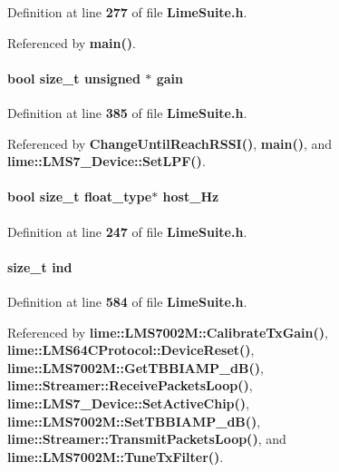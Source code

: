Definition at line {\bf 277} of file {\bf Lime\+Suite.\+h}.



Referenced by {\bf main()}.

\paragraph[{gain}]{\setlength{\rightskip}{0pt plus 5cm}bool size\+\_\+t unsigned $\ast$ gain}\label{group__FN__HIGH__LVL_ga1275acc2013b13f44e8d43fcde951ef1}


Definition at line {\bf 385} of file {\bf Lime\+Suite.\+h}.



Referenced by {\bf Change\+Until\+Reach\+R\+S\+S\+I()}, {\bf main()}, and {\bf lime\+::\+L\+M\+S7\+\_\+\+Device\+::\+Set\+L\+P\+F()}.

\paragraph[{host\+\_\+\+Hz}]{\setlength{\rightskip}{0pt plus 5cm}bool size\+\_\+t {\bf float\+\_\+type}$\ast$ host\+\_\+\+Hz}\label{group__FN__HIGH__LVL_gaaa9184e2d61bf9dd267f76bb5db90d50}


Definition at line {\bf 247} of file {\bf Lime\+Suite.\+h}.

\paragraph[{ind}]{\setlength{\rightskip}{0pt plus 5cm}size\+\_\+t ind}\label{group__FN__HIGH__LVL_ga454e87c3d8b7400aa865dc281f39c409}


Definition at line {\bf 584} of file {\bf Lime\+Suite.\+h}.



Referenced by {\bf lime\+::\+L\+M\+S7002\+M\+::\+Calibrate\+Tx\+Gain()}, {\bf lime\+::\+L\+M\+S64\+C\+Protocol\+::\+Device\+Reset()}, {\bf lime\+::\+L\+M\+S7002\+M\+::\+Get\+T\+B\+B\+I\+A\+M\+P\+\_\+d\+B()}, {\bf lime\+::\+Streamer\+::\+Receive\+Packets\+Loop()}, {\bf lime\+::\+L\+M\+S7\+\_\+\+Device\+::\+Set\+Active\+Chip()}, {\bf lime\+::\+L\+M\+S7002\+M\+::\+Set\+T\+B\+B\+I\+A\+M\+P\+\_\+d\+B()}, {\bf lime\+::\+Streamer\+::\+Transmit\+Packets\+Loop()}, and {\bf lime\+::\+L\+M\+S7002\+M\+::\+Tune\+Tx\+Filter()}.

